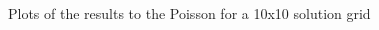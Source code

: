 \documentclass[]{aiaa-tc}%
\begin{document}
\begin{figure}[htb]%
  \caption{Plots of the results to the Poisson for a 10x10 solution grid}
  \begin{subfigmatrix}{2}

\end{subfigmatrix}
\end{figure}
\end{document}
